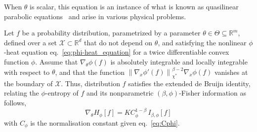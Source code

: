 \documentclass[entropy,article,submit,moreauthors,pdftex]{Definitions/mdpi}
\newcommand{\SZ}[1]{{\color{blue} #1}}                                       %
\def\Rset{\mathbb{R}}%
\def\X{\mathcal{X}}%
\begin{document}
\SZ{When $\theta$ is  scalar, this equation is  an instance of what  is known as
  quasilinear  parabolic  equations~\cite[\S~8.8]{Rou05}  and arise  in  various
  physical problems.}


\begin{Proposition}
\label{prop:phiDeBruijn}
%
  Let $f$ be a probability distribution, parametrized by a parameter $\theta \in
  \Theta \subseteq \Rset^m$, defined over a set $\X \subset \Rset^d$ that do not
  depend  on  $\theta$,  and   satisfying  the  nonlinear  $\phi$-heat  equation
  eq.~\eqref{eq:phi-heat_equation}  for a  twice differentiable  convex function
  $\phi$.   Assume that  $\nabla_\theta  \phi(f)$ is  absolutely integrable  and
  locally integrable  with respect to  $\theta$, and that the  function $\left\|
  \nabla_x  \phi'(f) \right\|_{\chi^*}^{\beta-2}  \nabla_x \phi(f)$  vanishes at
  the boundary of $\X$.  Thus, distribution $f$ satisfies the extended de Bruijn
  identity,   relating  the   $\phi$-entropy  of   $f$  and   its  nonparametric
  $(\beta,\phi)$-Fisher information as follows,
  \begin{equation}
  \label{eq:phiDeBruijn}
  \nabla_\theta H_\phi[f] = K C_\phi^{1-\beta} \, I_{\beta,\phi}[f]
  \end{equation}
  with $C_\phi$ is the normalisation constant given eq.~\eqref{eq:Cphi}.
\end{Proposition}
\end{document}
